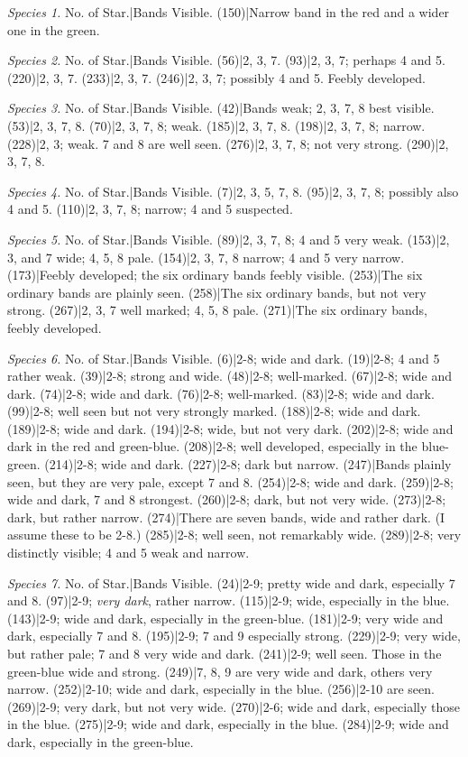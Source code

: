 \documentclass[a4paper, 12pt, oneside, polutonikogreek, english]{article}
\begin{document}
\emph{Species 1.} 
No. of Star.|Bands Visible. 
(150)|Narrow band in the red and a wider one in the green. 

\emph{Species 2.} 
No. of Star.|Bands Visible. 
(56)|2, 3, 7. 
(93)|2, 3, 7; perhaps 4 and 5. 
(220)|2, 3, 7. 
(233)|2, 3, 7. 
(246)|2, 3, 7; possibly 4 and 5. Feebly developed. 

\emph{Species 3.} 
No. of Star.|Bands Visible. 
(42)|Bands weak; 2, 3, 7, 8 best visible. 
(53)|2, 3, 7, 8. 
(70)|2, 3, 7, 8; weak. 
(185)|2, 3, 7, 8. 
(198)|2, 3, 7, 8; narrow. 
(228)|2, 3; weak. 7 and 8 are well seen. 
(276)|2, 3, 7, 8; not very strong. 
(290)|2, 3, 7, 8. 

\emph{Species 4.} 
No. of Star.|Bands Visible. 
(7)|2, 3, 5, 7, 8. 
(95)|2, 3, 7, 8; possibly also 4 and 5. 
(110)|2, 3, 7, 8; narrow; 4 and 5 suspected. 

\emph{Species 5.} 
No. of Star.|Bands Visible. 
(89)|2, 3, 7, 8; 4 and 5 very weak. 
(153)|2, 3, and 7 wide; 4, 5, 8 pale. 
(154)|2, 3, 7, 8 narrow; 4 and 5 very narrow. 
(173)|Feebly developed; the six ordinary bands feebly visible. 
(253)|The six ordinary bands are plainly seen. 
(258)|The six ordinary bands, but not very strong. 
(267)|2, 3, 7 well marked; 4, 5, 8 pale. 
(271)|The six ordinary bands, feebly developed. 

\emph{Species 6.} 
No. of Star.|Bands Visible. 
(6)|2-8; wide and dark. 
(19)|2-8; 4 and 5 rather weak. 
(39)|2-8; strong and wide. 
(48)|2-8; well-marked. 
(67)|2-8; wide and dark. 
(74)|2-8; wide and dark. 
(76)|2-8; well-marked. 
(83)|2-8; wide and dark. 
(99)|2-8; well seen but not very strongly marked. 
(188)|2-8; wide and dark. 
(189)|2-8; wide and dark. 
(194)|2-8; wide, but not very dark. 
(202)|2-8; wide and dark in the red and green-blue. 
(208)|2-8; well developed, especially in the blue-green. 
(214)|2-8; wide and dark. 
(227)|2-8; dark but narrow. 
(247)|Bands plainly seen, but they are very pale, except 7 and 8. 
(254)|2-8; wide and dark. 
(259)|2-8; wide and dark, 7 and 8 strongest. 
(260)|2-8; dark, but not very wide. 
(273)|2-8; dark, but rather narrow. 
(274)|There are seven bands, wide and rather dark. (I assume these to be 2-8.) 
(285)|2-8; well seen, not remarkably wide. 
(289)|2-8; very distinctly visible; 4 and 5 weak and narrow. 

\emph{Species 7.} 
No. of Star.|Bands Visible. 
(24)|2-9; pretty wide and dark, especially 7 and 8. 
(97)|2-9; \emph{very dark}, rather narrow. 
(115)|2-9; wide, especially in the blue. 
(143)|2-9; wide and dark, especially in the green-blue. 
(181)|2-9; very wide and dark, especially 7 and 8. 
(195)|2-9; 7 and 9 especially strong. 
(229)|2-9; very wide, but rather pale; 7 and 8 very wide and dark. 
(241)|2-9; well seen. Those in the green-blue wide and strong. 
(249)|7, 8, 9 are very wide and dark, others very narrow. 
(252)|2-10; wide and dark, especially in the blue. 
(256)|2-10 are seen. 
(269)|2-9; very dark, but not very wide. 
(270)|2-6; wide and dark, especially those in the blue. 
(275)|2-9; wide and dark, especially in the blue. 
(284)|2-9; wide and dark, especially in the green-blue. 
\end{document}
